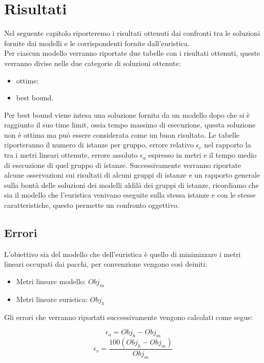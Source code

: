 
\hypertarget{(chap:capitolo7)}{}
\chapter{Risultati}
Nel seguente capitolo riporteremo i risultati ottenuti dai confronti tra le soluzioni fornite dai modelli e le corrispondenti fornite dall'euristica.\\
Per ciascun modello verranno riportate due tabelle con i risultati ottenuti, queste verranno divise nelle due categorie di soluzioni ottenute:
\begin{itemize}
	\item ottime;
	\item best bound.
\end{itemize} 
Per best bound viene intesa una soluzione fornita da un modello dopo che si è raggiunto il suo time limit, ossia tempo massimo di esecuzione, questa soluzione non è ottima ma può essere considerata come un buon risultato.
Le tabelle riporteranno il numero di istanze per gruppo, errore relativo $\epsilon_r$ nel rapporto la tra i metri lineari ottenute, errore assoluto $\epsilon_a$ espresso in metri e il tempo medio di esecuzione di quel gruppo di istanze. Successivamente verranno riportate alcune osservazioni sui risultati di alcuni gruppi di istanze e un rapporto generale sulla bontà delle soluzioni dei modelli aldilà dei gruppi di istanze, ricordiamo che sia il modello che l'euristica venivano eseguite sulla stessa istanze e con le stesse caratteristiche, questo permette un confronto oggettivo.

\newpage
\section{Errori}
L'obiettivo sia del modello che dell'euristica è quello di minimizzare i metri lineari occupati dai pacchi, per convenzione vengono così deiniti:
\begin{itemize}
	\item Metri lineare modello: $Obj_m$
	\item Metri lineare euristica: $Obj_h$
\end{itemize}

Gli errori che verranno riportati successivamente vengono calcolati come segue:
\begin{center}
	$$\epsilon_a = Obj_h - Obj_m$$
	$$\epsilon_r = \frac{100 (Obj_h - Obj_m) }{Obj_m}$$
\end{center}

